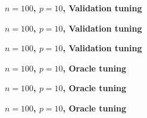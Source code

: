 \documentclass{article}
\begin{document}
\begin{figure}[p]
\centering
{\Large\bf $n=100$, $p=10$, Validation tuning} \\
\bigskip

\end{figure}

\begin{figure}[p]
\centering
{\Large\bf $n=100$, $p=10$, Validation tuning} \\
\bigskip

\end{figure}

\begin{figure}[p]
\centering
{\Large\bf $n=100$, $p=10$, Validation tuning} \\
\bigskip

\end{figure}

\begin{figure}[p]
\centering
{\Large\bf $n=100$, $p=10$, Oracle tuning} \\
\bigskip

\end{figure}

\begin{figure}[p]
\centering
{\Large\bf $n=100$, $p=10$, Oracle tuning} \\
\bigskip

\end{figure}

\begin{figure}[p]
\centering
{\Large\bf $n=100$, $p=10$, Oracle tuning} \\
\bigskip

\end{figure}
\end{document}
